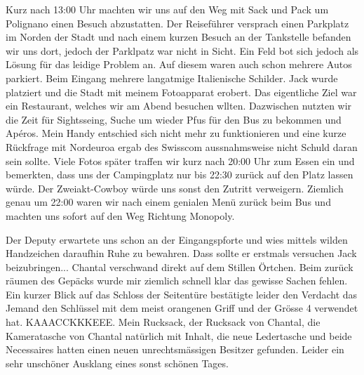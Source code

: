Kurz nach 13:00 Uhr machten wir uns auf den Weg mit Sack und Pack um Polignano einen Besuch abzustatten.
Der Reiseführer versprach einen Parkplatz im Norden der Stadt und nach einem kurzen Besuch an der Tankstelle befanden wir uns dort, jedoch der Parklpatz war nicht in Sicht.
Ein Feld bot sich jedoch als Lösung für das leidige Problem an.
Auf diesem waren auch schon mehrere Autos parkiert.
Beim Eingang mehrere langatmige Italienische Schilder.
Jack wurde platziert und die Stadt mit meinem Fotoapparat erobert.
Das eigentliche Ziel war ein Restaurant, welches wir am Abend besuchen wllten.
Dazwischen nutzten wir die Zeit für Sightsseing, Suche um wieder Pfus für den Bus zu bekommen und Apéros.
Mein Handy entschied sich nicht mehr zu funktionieren und eine kurze Rückfrage mit Nordeuroa ergab des Swisscom aussnahmsweise nicht Schuld daran sein sollte.
Viele Fotos später traffen wir kurz nach 20:00 Uhr zum Essen ein und bemerkten, dass uns der Campingplatz nur bis 22:30 zurück auf den Platz lassen würde.
Der Zweiakt-Cowboy würde uns sonst den Zutritt verweigern.
Ziemlich genau um 22:00 waren wir nach einem genialen Menü zurück beim Bus und machten uns sofort auf den Weg Richtung Monopoly.

Der Deputy erwartete uns schon an der Eingangspforte und wies mittels wilden Handzeichen daraufhin Ruhe zu bewahren.
Dass sollte er erstmals versuchen Jack beizubringen... Chantal verschwand direkt auf dem Stillen Örtchen.
Beim zurück räumen des Gepäcks wurde mir ziemlich schnell klar das gewisse Sachen fehlen.
Ein kurzer Blick auf das Schloss der Seitentüre bestätigte leider den Verdacht das Jemand den Schlüssel mit dem meist orangenen Griff und der Grösse 4 verwendet hat.
KAAACCKKKEEE.
Mein Rucksack, der Rucksack von Chantal, die Kameratasche von Chantal natürlich mit Inhalt, die neue Ledertasche und beide Necessaires hatten einen neuen unrechtsmässigen Besitzer gefunden.
Leider ein sehr unschöner Ausklang eines sonst schönen Tages.

